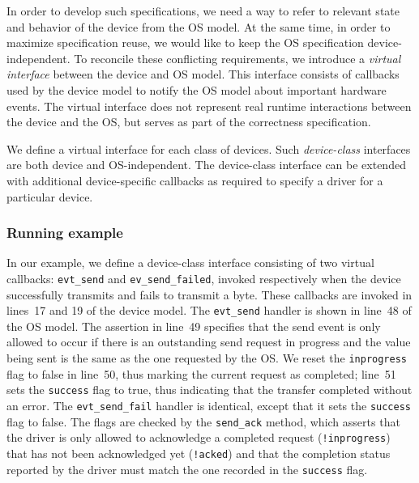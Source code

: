 \documentclass[a4paper,twoside,openright,11pt]{book}
\theoremstyle{definition}
\newcommand{\src}[1]{\texttt{\small #1}}
\begin{document}
In order to develop such specifications, we need a way to refer to relevant state and behavior of the device from the OS model.  At the same time, in order to maximize specification reuse, we would like to keep the OS specification device-independent.  To reconcile these conflicting requirements, we introduce a \emph{virtual interface} between the device and OS model.  This interface consists of callbacks used by the device model to notify the OS model about important hardware events.  The virtual interface does not represent real runtime interactions between the device and the OS, but serves as part of the correctness specification.

We define a virtual interface for each class of devices.  Such \emph{device-class} interfaces are both device and OS-independent.  The device-class interface can be extended with additional device-specific callbacks as required to specify a driver for a particular device.

\subsubsection{Running example}

In our example, we define a device-class interface consisting of two virtual callbacks: \src{evt\_send} and \src{ev\_send\_failed}, invoked respectively when the device successfully transmits and fails to transmit a byte.  These callbacks are invoked in lines~17 and 19 of the device model.  The \src{evt\_send} handler is shown in line~48 of the OS model.  The assertion in line~49 specifies that the send event is only allowed to occur if there is an outstanding send request in progress and the value being sent is the same as the one requested by the OS.  We reset the \src{inprogress} flag to false in line~50, thus marking the current request as completed; line~51 sets the \src{success} flag to true, thus indicating that the transfer completed without an error.  The \src{evt\_send\_fail} handler is identical, except that it sets the \src{success} flag to false.  The flags are checked by the \src{send\_ack} method, which asserts that the driver is only allowed to acknowledge a completed request (\src{!inprogress}) that has not been acknowledged yet (\src{!acked}) and that the completion status reported by the driver must match the one recorded in the \src{success} flag.
\end{document}
